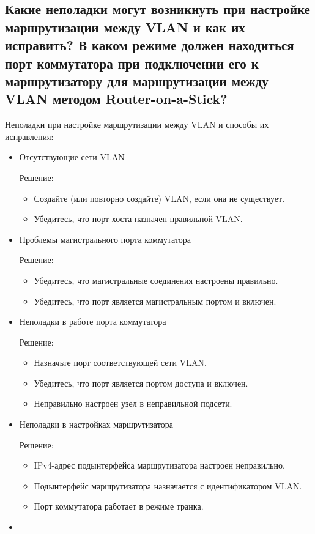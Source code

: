 \subsection{Какие неполадки могут возникнуть при настройке маршрутизации между VLAN и как их исправить?
В каком режиме должен находиться порт коммутатора при подключении его к маршрутизатору для
маршрутизации между VLAN методом Router-on-a-Stick? }
Неполадки при настройке маршрутизации между VLAN и способы их
исправления:
\begin{itemize}
    \item Отсутствующие сети VLAN \par
    Решение:
    \begin{itemize}
        \item Создайте (или повторно создайте) VLAN, если она не
        существует.
        \item Убедитесь, что порт хоста назначен правильной VLAN.
    \end{itemize}

    \item Проблемы магистрального порта коммутатора \par
    Решение:
    \begin{itemize}
        \item Убедитесь, что магистральные соединения настроены правильно.
        \item Убедитесь, что порт является магистральным портом и включен.
    \end{itemize}

    \item Неполадки в работе порта коммутатора \par
    Решение:
    \begin{itemize}
        \item Назначьте порт соответствующей сети VLAN.
        \item Убедитесь, что порт является портом доступа и включен.
        \item Неправильно настроен узел в неправильной подсети.
    \end{itemize}

    \item Неполадки в настройках маршрутизатора\par
    Решение:
    \begin{itemize}
        \item IPv4-адрес подынтерфейса маршрутизатора настроен
        неправильно.
        \item Подынтерфейс маршрутизатора назначается с идентификатором
        VLAN.
        \item Порт коммутатора работает в режиме транка.
    \end{itemize}
    \item
\end{itemize}


